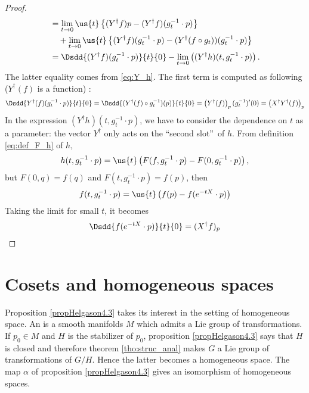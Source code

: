 \begin{proof}
\begin{equation}
\begin{aligned}
                     &=\lim_{t\to 0}\us{t}\left\{ (Y^{\dag} f)p-(Y^{\dag} f)(g_t^{-1}\cdot p) \right\}\\
		     &\quad+\lim_{t\to 0}\us{t}\left\{ (Y^{\dag} f)(g_t^{-1}\cdot p)
		                                      -(Y^{\dag}(f\circ g_t) )(g_t^{-1}\cdot p)
					       \right\}\\
   &=\Dsdd{ (Y^{\dag} f)(g_t^{-1}\cdot p) }{t}{0}-\lim_{t\to 0} 
                \left(    (Y^{\dag} h)(t,g_t^{-1}\cdot p)       \right).
\end{aligned}
\end{equation}
The latter equality comes from  \eqref{eq:Y_h}. The first term is computed as following ($Y^{\dag}(f)$ is a function) :
\begin{equation}
\Dsdd{ Y^{\dag}(f)(g_t^{-1}\cdot p) }{t}{0}=\Dsdd{ (Y^{\dag}(f)\circ g_t^{-1})(p) }{t}{0}
                                        =\left( Y^{\dag}(f) \right)_p(g_t^{-1})'(0)
					=\left( X^{\dag} Y^{\dag}(f)\right)_p
\end{equation}
In the expression $(Y^{\dag} h)(t,g_t^{-1}\cdot p)$, we have to consider the dependence on $t$ as a parameter: the vector $Y^{\dag}$ only acts on the ``second slot''\ of $h$. From definition \eqref{eq:def_F_h} of $h$,
\[
   h(t,g_t^{-1}\cdot p)=\us{t}\left(  F(f,g_t^{-1}\cdot p)-F(0,g_t^{-1}\cdot p)  
                             \right),
\]
but $F(0,q)=f(q)$ and $F(t,g_t^{-1}\cdot p)=f(p)$, then
\[
  f(t,g_t^{-1}\cdot p)=\us{t}\left( f(p)-f(e^{-tX}\cdot p) \right)
\]
Taking the limit for small $t$, it becomes 
\[
  \Dsdd{f(e^{-tX}\cdot p)}{t}{0}=(X^{\dag} f)_p
\]

\end{proof}

\section{Cosets and homogeneous spaces}

Proposition \ref{propHelgason4.3} takes its interest in the setting of homogeneous space. An  is a smooth manifolds $M$ which admits a Lie group of transformations. If $p_{0}\in M$ and $H$ is the stabilizer of $p_{0}$, proposition \ref{propHelgason4.3} says that $H$ is closed and therefore theorem \ref{tho:struc_anal} makes $G$ a Lie group of transformations of $G/H$. Hence the latter becomes a homogeneous space. The map $\alpha$ of proposition \ref{propHelgason4.3} gives an isomorphism of homogeneous spaces. 

